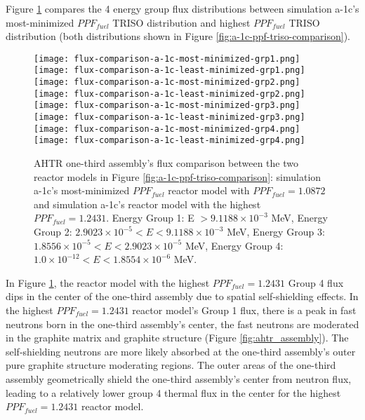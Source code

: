 Figure \ref{fig:a-1c-flux-comparison} compares the 4 energy group flux distributions 
between simulation a-1c's most-minimized $PPF_{fuel}$ TRISO distribution and highest 
$PPF_{fuel}$ TRISO distribution (both distributions shown in Figure 
\ref{fig:a-1c-ppf-triso-comparison}). 
\begin{figure}[htbp!]
    \centering
    \texttt{[image: flux-comparison-a-1c-most-minimized-grp1.png]} 
    \texttt{[image: flux-comparison-a-1c-least-minimized-grp1.png]} 
    \texttt{[image: flux-comparison-a-1c-most-minimized-grp2.png]} 
    \texttt{[image: flux-comparison-a-1c-least-minimized-grp2.png]} 
    \texttt{[image: flux-comparison-a-1c-most-minimized-grp3.png]} 
    \texttt{[image: flux-comparison-a-1c-least-minimized-grp3.png]} 
    \texttt{[image: flux-comparison-a-1c-most-minimized-grp4.png]} 
    \texttt{[image: flux-comparison-a-1c-least-minimized-grp4.png]} 
    \caption{AHTR one-third assembly's flux comparison between the two reactor models 
    in Figure \ref{fig:a-1c-ppf-triso-comparison}: simulation a-1c's most-minimized 
    $PPF_{fuel}$ reactor model with $PPF_{fuel} = 1.0872$ and simulation a-1c's reactor 
    model with the highest $PPF_{fuel} = 1.2431$.
    Energy Group 1: E $> 9.1188 \times 10^{-3}$ MeV, 
    Energy Group 2: $2.9023 \times 10^{-5} < E < 9.1188 \times 10^{-3}$ MeV,
    Energy Group 3:  $1.8556 \times 10^{-5} < E < 2.9023 \times 10^{-5}$ MeV,
    Energy Group 4:  $1.0 \times 10^{-12} < E < 1.8554 \times 10^{-6}$ MeV.}
    \label{fig:a-1c-flux-comparison}
\end{figure}

In Figure \ref{fig:a-1c-flux-comparison}, the reactor model with the highest 
$PPF_{fuel} = 1.2431$ Group 4 flux dips in the center of the one-third assembly 
due to spatial self-shielding effects. 
In the highest $PPF_{fuel} = 1.2431$ reactor model's Group 1 flux, there is a peak in 
fast neutrons born in the one-third assembly's center, the fast neutrons are moderated 
in the graphite matrix and graphite structure (Figure \ref{fig:ahtr_assembly}). 
The self-shielding neutrons are more likely absorbed at the one-third assembly's outer 
pure graphite structure moderating regions. 
The outer areas of the one-third assembly geometrically shield the one-third assembly's 
center from neutron flux, leading to a relatively lower group 4 thermal flux in the 
center for the highest $PPF_{fuel} = 1.2431$ reactor model.


